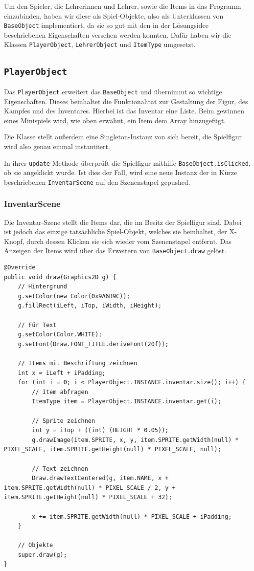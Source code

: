 
Um den Spieler, die Lehrerinnen und Lehrer, sowie die Items in das Programm einzubinden, haben wir diese als Spiel-Objekte, also als Unterklassen von \texttt{BaseObject} implementiert, da sie so gut mit den in der Lösungsidee beschriebenen Eigenschaften versehen werden konnten. Dafür haben wir die Klassen \texttt{PlayerObject}, \texttt{LehrerObject} und \texttt{ItemType} umgesetzt.

\subsection{\texttt{PlayerObject}}
Das \texttt{PlayerObject} erweitert das \texttt{BaseObject} und übernimmt so wichtige Eigenschaften. Dieses beinhaltet die Funktionalität zur Gestaltung der Figur, des Kampfes und des Inventares. Hierbei ist das Inventar eine Liste. Beim gewinnen eines Minispiels wird, wie oben erwähnt, ein Item dem Array hinzugefügt.

Die Klasse stellt außerdem eine Singleton-Instanz von sich bereit, die
Spielfigur wird also genau einmal instantiiert.

In ihrer \texttt{update}-Methode überprüft die Spielfigur mithilfe \texttt{BaseObject.isClicked}, ob sie angeklickt wurde. Ist dies der Fall, wird eine neue Instanz der in Kürze beschriebenen \texttt{InventarScene} auf den Szenenstapel gepushed.


\subsubsection{InventarScene}

Die Inventar-Szene stellt die Items dar, die im Besitz der Spielfigur sind.
Dabei ist jedoch das einzige tatsächliche Spiel-Objekt, welches sie beinhaltet,
der \glqq{}X\grqq{}-Knopf, durch dessen Klicken sie sich wieder vom Szenenstapel
entfernt. Das Anzeigen der Items wird über das Erweitern von \texttt{BaseObject.draw}
gelöst.

\begin{lstlisting}
@Override
public void draw(Graphics2D g) {
	// Hintergrund
	g.setColor(new Color(0x9A6B9C));
	g.fillRect(iLeft, iTop, iWidth, iHeight);
	
	// Für Text
	g.setColor(Color.WHITE);
	g.setFont(Draw.FONT_TITLE.deriveFont(20f));
	
	// Items mit Beschriftung zeichnen
	int x = iLeft + iPadding;
	for (int i = 0; i < PlayerObject.INSTANCE.inventar.size(); i++) {
		// Item abfragen
		ItemType item = PlayerObject.INSTANCE.inventar.get(i);
		
		// Sprite zeichnen
		int y = iTop + ((int) (HEIGHT * 0.05));
		g.drawImage(item.SPRITE, x, y, item.SPRITE.getWidth(null) * PIXEL_SCALE, item.SPRITE.getHeight(null) * PIXEL_SCALE, null);
		
		// Text zeichnen
		Draw.drawTextCentered(g, item.NAME, x + item.SPRITE.getWidth(null) * PIXEL_SCALE / 2, y + item.SPRITE.getHeight(null) * PIXEL_SCALE + 32);
		
		x += item.SPRITE.getWidth(null) * PIXEL_SCALE + iPadding;
	}
	
	// Objekte
	super.draw(g);
}
\end{lstlisting}

